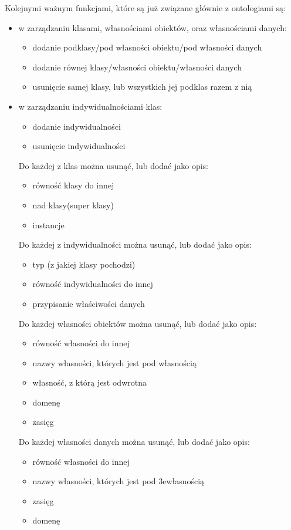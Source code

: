 \documentclass[a4paper,12pt, twoside]{book} %
\begin{document}
Kolejnymi ważnym funkcjami, które są już związane głównie z ontologiami są:
\begin{itemize}
	\item w zarządzaniu klasami, własnościami obiektów, oraz własnościami danych:
	\begin{itemize}
		\item dodanie podklasy/pod własności obiektu/pod własności danych
		\item dodanie równej klasy/własności obiektu/własności danych
		\item usunięcie samej klasy, lub wszystkich jej podklas razem z nią
	\end{itemize}
	\item w zarządzaniu indywidualnościami klas:
	\begin{itemize}
		\item dodanie indywidualności
		\item usunięcie indywidualności
	\end{itemize}
	Do każdej z klas można usunąć, lub dodać jako opis:
	\begin{itemize}
		\item równość klasy do innej
		\item nad klasy(super klasy)
		\item instancje
	\end{itemize}
	Do każdej z indywidualności można usunąć, lub dodać jako opis:
	\begin{itemize}
		\item typ (z jakiej klasy pochodzi)
		\item równość indywidualności do innej
		\item przypisanie właściwości danych
	\end{itemize}
	Do każdej własności obiektów można usunąć, lub dodać jako opis:
	\begin{itemize}
		\item równość własności do innej
		\item nazwy własności, których jest pod własnością
		\item własność, z którą jest odwrotna
		\item domenę
		\item zasięg
	\end{itemize}
	Do każdej własności danych można usunąć, lub dodać jako opis:
	\begin{itemize}
		\item równość własności do innej
		\item nazwy własności, których jest pod 3ewłasnością
		\item zasięg
		\item domenę
	\end{itemize}
\end{itemize}
\end{document}
